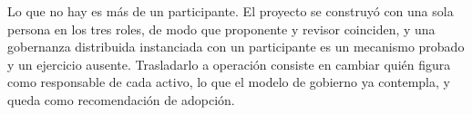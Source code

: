 Lo que no hay es más de un participante. El proyecto se construyó con una
sola persona en los tres roles, de modo que proponente y revisor coinciden, y
una gobernanza distribuida instanciada con un participante es un mecanismo
probado y un ejercicio ausente. Trasladarlo a operación consiste en cambiar
quién figura como responsable de cada activo, lo que el modelo de gobierno ya
contempla, y queda como recomendación de adopción.
